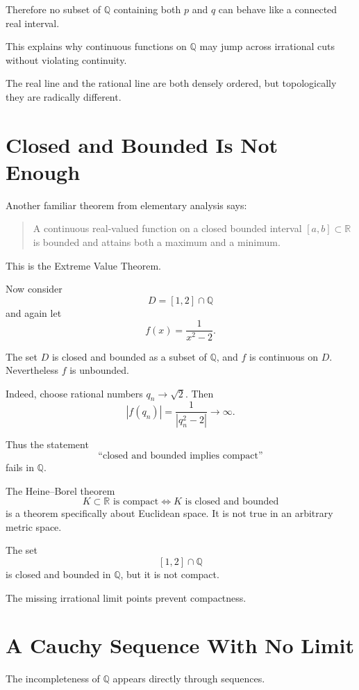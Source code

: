 \documentclass{essay}
\begin{document}
Therefore no subset of \(\mathbb{Q}\) containing both \(p\) and \(q\) can
behave like a connected real interval.

This explains why continuous functions on \(\mathbb{Q}\) may jump across
irrational cuts without violating continuity.

The real line and the rational line are both densely ordered, but topologically
they are radically different.

\section{Closed and Bounded Is Not Enough}

Another familiar theorem from elementary analysis says:

\begin{quote}
  A continuous real-valued function on a closed bounded interval
  \([a,b]\subset\mathbb{R}\) is bounded and attains both a maximum and a minimum.
\end{quote}

This is the Extreme Value Theorem.

Now consider
\[ D=[1,2]\cap\mathbb{Q} \]
and again let
\[ f(x)=\frac{1}{x^{2}-2}. \]

The set \(D\) is closed and bounded as a subset of \(\mathbb{Q}\), and \(f\) is
continuous on \(D\). Nevertheless \(f\) is unbounded.

Indeed, choose rational numbers \(q_{n}\to\sqrt{2}\). Then
\[ |f(q_{n})| = \frac{1}{|q_{n}^{2}-2|} \to\infty. \]

Thus the statement
\[ \text{``closed and bounded implies compact''} \]
fails in \(\mathbb{Q}\).

The Heine--Borel theorem
\[ K\subset\mathbb{R} \text{ is compact} \iff K\text{ is closed and bounded} \]
is a theorem specifically about Euclidean space. It is not true in an
arbitrary metric space.

The set
\[ [1,2]\cap\mathbb{Q} \]
is closed and bounded in \(\mathbb{Q}\), but it is not compact.

The missing irrational limit points prevent compactness.

\section{A Cauchy Sequence With No Limit}

The incompleteness of \(\mathbb{Q}\) appears directly through sequences.
\end{document}
